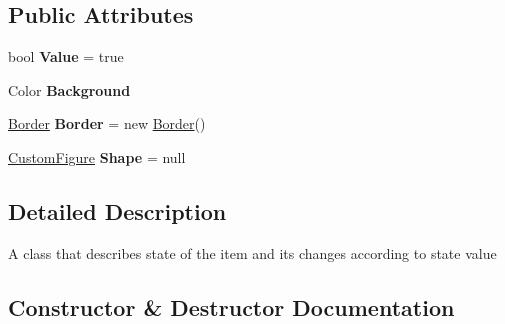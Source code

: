 \subsection*{Public Attributes}
\begin{DoxyCompactItemize}
\item 
\mbox{\label{class_space_v_i_l_1_1_decorations_1_1_item_state_a40696513c0f34ce689a9f9923e91e667}} 
bool {\bfseries Value} = true
\item 
\mbox{\label{class_space_v_i_l_1_1_decorations_1_1_item_state_aebf6aeb24d8765502fe96fafd92b8d53}} 
Color {\bfseries Background}
\item 
\mbox{\label{class_space_v_i_l_1_1_decorations_1_1_item_state_ade560b8402745458667e088c6a75aa4a}} 
\mbox{\hyperlink{class_space_v_i_l_1_1_decorations_1_1_border}{Border}} {\bfseries Border} = new \mbox{\hyperlink{class_space_v_i_l_1_1_decorations_1_1_border}{Border}}()
\item 
\mbox{\label{class_space_v_i_l_1_1_decorations_1_1_item_state_af69b29e933a3eea82d37630d57576160}} 
\mbox{\hyperlink{class_space_v_i_l_1_1_decorations_1_1_custom_figure}{Custom\+Figure}} {\bfseries Shape} = null
\end{DoxyCompactItemize}


\subsection{Detailed Description}
A class that describes state of the item and its changes according to state value 



\subsection{Constructor \& Destructor Documentation}
\mbox{\label{class_space_v_i_l_1_1_decorations_1_1_item_state_ad99c8d13eed2d2a995bbccc7b4d38ab5}} 
